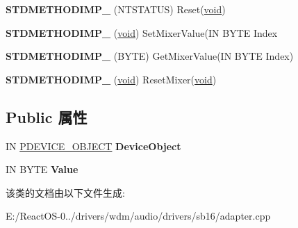 \begin{DoxyCompactItemize}
{\bfseries S\+T\+D\+M\+E\+T\+H\+O\+D\+I\+M\+P\+\_\+} (N\+T\+S\+T\+A\+T\+US) Reset(\hyperlink{interfacevoid}{void})
\item 
\mbox{\label{class_c_adapter_s_b16_ae96ca636bb1e25009d9fecb82477f167}} 
{\bfseries S\+T\+D\+M\+E\+T\+H\+O\+D\+I\+M\+P\+\_\+} (\hyperlink{interfacevoid}{void}) Set\+Mixer\+Value(IN B\+Y\+TE Index
\item 
\mbox{\label{class_c_adapter_s_b16_a649fe23df53c824d47ad12f3f38f6234}} 
{\bfseries S\+T\+D\+M\+E\+T\+H\+O\+D\+I\+M\+P\+\_\+} (B\+Y\+TE) Get\+Mixer\+Value(IN B\+Y\+TE Index)
\item 
\mbox{\label{class_c_adapter_s_b16_a79ac0e32468276cdca34cb03f84fadef}} 
{\bfseries S\+T\+D\+M\+E\+T\+H\+O\+D\+I\+M\+P\+\_\+} (\hyperlink{interfacevoid}{void}) Reset\+Mixer(\hyperlink{interfacevoid}{void})
\end{DoxyCompactItemize}
\subsection*{Public 属性}
\begin{DoxyCompactItemize}
\item 
\mbox{\label{class_c_adapter_s_b16_aab4c1f2a4539830059f76166f4949abd}} 
IN \hyperlink{struct___d_e_v_i_c_e___o_b_j_e_c_t}{P\+D\+E\+V\+I\+C\+E\+\_\+\+O\+B\+J\+E\+CT} {\bfseries Device\+Object}
\item 
\mbox{\label{class_c_adapter_s_b16_a81b4331ce4accfe5e3b1240f8366fe73}} 
IN B\+Y\+TE {\bfseries Value}
\end{DoxyCompactItemize}


该类的文档由以下文件生成\+:\begin{DoxyCompactItemize}
\item 
E\+:/\+React\+O\+S-\/0../drivers/wdm/audio/drivers/sb16/adapter.\+cpp\end{DoxyCompactItemize}

